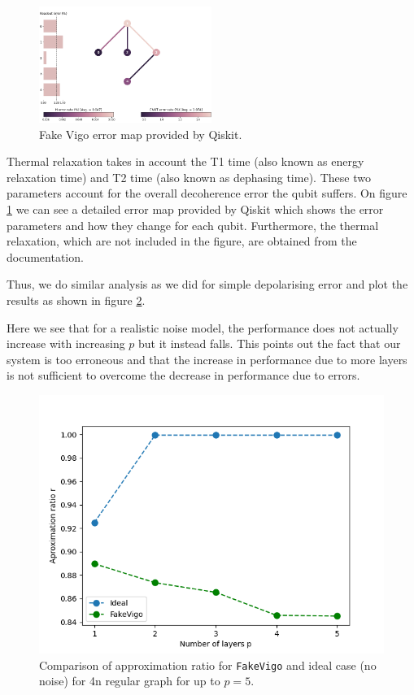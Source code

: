 \newpage

 \begin{figure}
    \centering
    \includegraphics[width=0.5\textwidth]{images/fakeVirginMap.png}
    \caption{Fake Vigo error map provided by Qiskit.}
    \label{fig:error}
\end{figure}

Thermal relaxation takes in account the T1 time (also known as energy relaxation time) and T2 time (also known as dephasing time). These two parameters account for the overall decoherence error the qubit suffers. On figure \ref{fig:error} we can see a detailed error map provided by Qiskit which shows the error parameters and how they change for each qubit. Furthermore, the thermal relaxation, which are not included in the figure, are obtained from the documentation\cite{vigo_ref}.

Thus, we do similar analysis as we did for simple depolarising error and plot the results as shown in figure \ref{fig:4n_fakeV}.

Here we see that for a realistic noise model, the performance does not actually increase with increasing $p$ but it instead falls.
This points out the fact that our system is too erroneous and that the increase in performance due to more layers is not sufficient to overcome the decrease in performance due to errors.

\begin{figure}[h]
    \centering
    \includegraphics[width=0.5\linewidth]{images/4 node regular graph with fake vigo.png}
    \caption{Comparison of approximation ratio for \texttt{FakeVigo} and ideal case (no noise) for 4n regular graph for up to $p = 5$.}
    \label{fig:4n_fakeV}
\end{figure}

